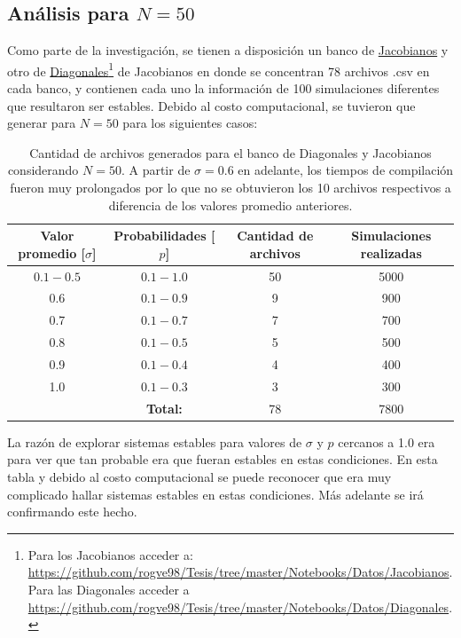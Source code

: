 \subsection{Análisis para $N=50$}

Como parte de la investigación, se tienen  a disposición un banco de \href{https://github.com/rogve98/Tesis/tree/master/Notebooks/Datos/Jacobianos}{Jacobianos} y otro de \href{https://github.com/rogve98/Tesis/tree/master/Notebooks/Datos/Diagonales}{Diagonales}\footnote{Para los Jacobianos acceder a: \url{https://github.com/rogve98/Tesis/tree/master/Notebooks/Datos/Jacobianos}. Para las Diagonales acceder a \url{https://github.com/rogve98/Tesis/tree/master/Notebooks/Datos/Diagonales}.} de Jacobianos en donde se concentran 78 archivos .csv en cada banco, y contienen cada uno la información de 100 simulaciones diferentes que resultaron ser estables. Debido al costo computacional, se tuvieron que generar para $N=50$ para los siguientes casos:
\begin{table}[h!]
	\centering
	 \begin{tabular}{|c|c|c|c|}
		\hline
		Valor promedio [$\sigma$] & Probabilidades [$p$] & Cantidad de archivos & Simulaciones realizadas \\ \hline
		$0.1-0.5$  & $0.1-1.0$  & 50 & 5000  \\ \hline
		0.6  & $0.1-0.9$  & 9 & 900 \\ \hline
		0.7  & $0.1-0.7$  & 7 & 700 \\ \hline
		0.8  & $0.1-0.5$  & 5 & 500 \\ \hline
		0.9  & $0.1-0.4$  & 4 & 400 \\ \hline
		1.0  & $0.1-0.3$  & 3 & 300 \\ \hline
		& \textbf{Total:} & 78& 7800\\ \hline
	\end{tabular}
	\caption{Cantidad de archivos generados para el banco de Diagonales y Jacobianos considerando $N=50$. A partir de $\sigma=0.6$ en adelante, los tiempos de compilación fueron muy prolongados por lo que no se obtuvieron los 10 archivos respectivos a diferencia de los valores promedio anteriores.}
	\label{tab:ejemplo}
\end{table} 

La razón de explorar sistemas estables para valores de $\sigma$ y $p$ cercanos a 1.0 era para ver que tan probable era que fueran estables en estas condiciones. En esta tabla y debido al costo computacional se puede reconocer que era muy complicado hallar sistemas estables en estas condiciones. Más adelante se irá confirmando este hecho. 

